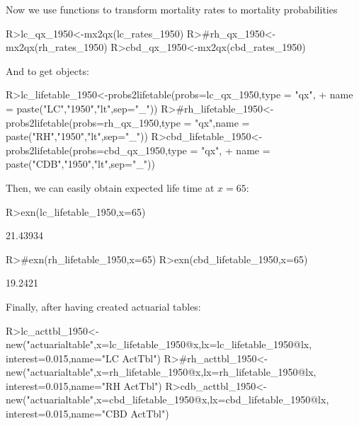 \documentclass[nojss]{jss}
\begin{document}
Now we use  functions to transform mortality rates to mortality probabilities

\begin{Schunk}
\begin{Sinput}
R>lc_qx_1950<-mx2qx(lc_rates_1950)
R>#rh_qx_1950<-mx2qx(rh_rates_1950)
R>cbd_qx_1950<-mx2qx(cbd_rates_1950)
\end{Sinput}
\end{Schunk}

And to get  objects:

\begin{Schunk}
\begin{Sinput}
R>lc_lifetable_1950<-probs2lifetable(probs=lc_qx_1950,type = "qx",
+   name = paste("LC","1950","lt",sep="_"))
R>#rh_lifetable_1950<-probs2lifetable(probs=rh_qx_1950,type = "qx",name = paste("RH","1950","lt",sep="_"))
R>cbd_lifetable_1950<-probs2lifetable(probs=cbd_qx_1950,type = "qx",
+   name = paste("CDB","1950","lt",sep="_"))
\end{Sinput}
\end{Schunk}

Then, we can easily obtain expected life time at $x=65$:

\begin{Schunk}
\begin{Sinput}
R>exn(lc_lifetable_1950,x=65)
\end{Sinput}
\begin{Soutput}
[1] 21.43934
\end{Soutput}
\begin{Sinput}
R>#exn(rh_lifetable_1950,x=65)
R>exn(cbd_lifetable_1950,x=65)
\end{Sinput}
\begin{Soutput}
[1] 19.2421
\end{Soutput}
\end{Schunk}

Finally, after having created actuarial tables:

\begin{Schunk}
\begin{Sinput}
R>lc_acttbl_1950<-new("actuarialtable",x=lc_lifetable_1950@x,lx=lc_lifetable_1950@lx, interest=0.015,name="LC ActTbl")
R>#rh_acttbl_1950<-new("actuarialtable",x=rh_lifetable_1950@x,lx=rh_lifetable_1950@lx, interest=0.015,name="RH ActTbl")
R>cdb_acttbl_1950<-new("actuarialtable",x=cbd_lifetable_1950@x,lx=cbd_lifetable_1950@lx, interest=0.015,name="CBD ActTbl")
\end{Sinput}
\end{Schunk}
\end{document}
